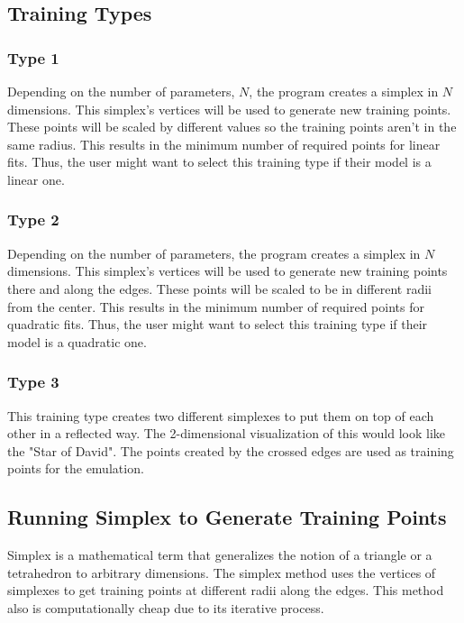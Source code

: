 \documentclass[main.tex]{subfiles}
\begin{document}
\subsection{Training Types}

\subsubsection{Type 1}
 Depending on the number of parameters, $N$, the program creates a simplex in $N$ dimensions. This simplex's vertices will be used to generate new training points. These points will be scaled by different values so the training points aren't in the same radius. This results in the minimum number of required points for linear fits. Thus, the user might want to select this training type if their model is a linear one. 

\subsubsection{Type 2}

 Depending on the number of parameters, the program creates a simplex in $N$ dimensions. This simplex's vertices will be used to generate new training points there and along the edges. These points will be scaled to be in different radii from the center. This results in the minimum number of required points for quadratic fits. Thus, the user might want to select this training type if their model is a quadratic one.
 
\subsubsection{Type 3}
This training type creates two different simplexes to put them on top of each other in a reflected way. The 2-dimensional visualization of this would look like the "Star of David". The points created by the crossed edges are used as training points for the emulation.

\subsection{Running Simplex to Generate Training Points}

Simplex is a mathematical term that generalizes the notion of a triangle or a tetrahedron to arbitrary dimensions. The simplex method uses the vertices of simplexes to get training points at different radii along the edges. This method also is computationally cheap due to its iterative process.
\end{document}

